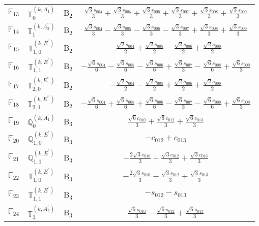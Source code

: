 \documentclass[fleqn,10pt,landscape]{article}
\begin{document}
\begin{itemize}
\begin{center}
\begin{longtable}{c|c|c|c}
$ \mathbb{F}_{13} $ & $\mathbb{T}_{0}^{(k,A_{1}^{\prime})}$ & B$_{2}$ & $\frac{\sqrt{3} s_{004}}{3} + \frac{\sqrt{3} s_{005}}{3} + \frac{\sqrt{3} s_{006}}{3} + \frac{\sqrt{3} s_{007}}{3} + \frac{\sqrt{3} s_{008}}{3} + \frac{\sqrt{3} s_{009}}{3}$ \\
$ \mathbb{F}_{14} $ & $\mathbb{T}_{1}^{(k,A_{2}^{\prime\prime})}$ & B$_{2}$ & $\frac{\sqrt{3} s_{004}}{3} - \frac{\sqrt{3} s_{005}}{3} - \frac{\sqrt{3} s_{006}}{3} - \frac{\sqrt{3} s_{007}}{3} + \frac{\sqrt{3} s_{008}}{3} + \frac{\sqrt{3} s_{009}}{3}$ \\
$ \mathbb{F}_{15} $ & $\mathbb{T}_{1,0}^{(k,E^{\prime})}$ & B$_{2}$ & $- \frac{\sqrt{2} s_{004}}{2} + \frac{\sqrt{2} s_{005}}{2} - \frac{\sqrt{2} s_{006}}{2} + \frac{\sqrt{2} s_{008}}{2}$ \\
$ \mathbb{F}_{16} $ & $\mathbb{T}_{1,1}^{(k,E^{\prime})}$ & B$_{2}$ & $- \frac{\sqrt{6} s_{004}}{6} - \frac{\sqrt{6} s_{005}}{6} - \frac{\sqrt{6} s_{006}}{6} + \frac{\sqrt{6} s_{007}}{3} - \frac{\sqrt{6} s_{008}}{6} + \frac{\sqrt{6} s_{009}}{3}$ \\
$ \mathbb{F}_{17} $ & $\mathbb{T}_{2,0}^{(k,E^{\prime\prime})}$ & B$_{2}$ & $- \frac{\sqrt{2} s_{004}}{2} - \frac{\sqrt{2} s_{005}}{2} + \frac{\sqrt{2} s_{006}}{2} + \frac{\sqrt{2} s_{008}}{2}$ \\
$ \mathbb{F}_{18} $ & $\mathbb{T}_{2,1}^{(k,E^{\prime\prime})}$ & B$_{2}$ & $- \frac{\sqrt{6} s_{004}}{6} + \frac{\sqrt{6} s_{005}}{6} + \frac{\sqrt{6} s_{006}}{6} - \frac{\sqrt{6} s_{007}}{3} - \frac{\sqrt{6} s_{008}}{6} + \frac{\sqrt{6} s_{009}}{3}$ \\ \hline
$ \mathbb{F}_{19} $ & $\mathbb{Q}_{0}^{(k,A_{1}^{\prime})}$ & B$_{3}$ & $\frac{\sqrt{6} c_{010}}{3} + \frac{\sqrt{6} c_{012}}{3} + \frac{\sqrt{6} c_{013}}{3}$ \\
$ \mathbb{F}_{20} $ & $\mathbb{Q}_{1,0}^{(k,E^{\prime})}$ & B$_{3}$ & $- c_{012} + c_{013}$ \\
$ \mathbb{F}_{21} $ & $\mathbb{Q}_{1,1}^{(k,E^{\prime})}$ & B$_{3}$ & $- \frac{2 \sqrt{3} c_{010}}{3} + \frac{\sqrt{3} c_{012}}{3} + \frac{\sqrt{3} c_{013}}{3}$ \\
$ \mathbb{F}_{22} $ & $\mathbb{T}_{1,0}^{(k,E^{\prime})}$ & B$_{3}$ & $- \frac{2 \sqrt{3} s_{010}}{3} - \frac{\sqrt{3} s_{012}}{3} + \frac{\sqrt{3} s_{013}}{3}$ \\
$ \mathbb{F}_{23} $ & $\mathbb{T}_{1,1}^{(k,E^{\prime})}$ & B$_{3}$ & $- s_{012} - s_{013}$ \\
$ \mathbb{F}_{24} $ & $\mathbb{T}_{3}^{(k,A_{2}^{\prime})}$ & B$_{3}$ & $\frac{\sqrt{6} s_{010}}{3} - \frac{\sqrt{6} s_{012}}{3} + \frac{\sqrt{6} s_{013}}{3}$ \\
\end{longtable}
\end{center}


\end{itemize}
\end{document}
